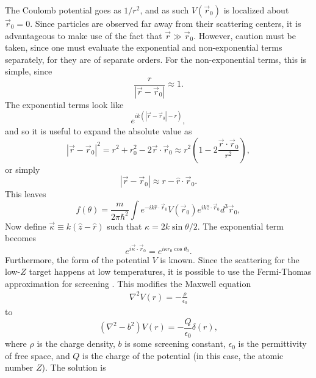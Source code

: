 The Coulomb potential goes as $1/r^2$, and as such $V(\vec{r}_0)$ is localized about $\vec{r}_0=0$. Since particles are observed far away from their scattering centers, it is advantageous to make use of the fact that $\vec{r} \gg \vec{r}_0$. However, caution must be taken, since one must evaluate the exponential and non-exponential terms separately, for they are of separate orders. For the non-exponential terms, this is simple, since
%
\begin{equation}\nonumber
\frac{r}{|\vec{r}-\vec{r}_0|}\approx1.
\end{equation}
%
The exponential terms look like
%
\begin{equation}\nonumber
e^{ik(|\vec{r}-\vec{r}_0|-r)},
\end{equation}
and so it is useful to expand the absolute value as
\begin{equation}\nonumber
|\vec{r}-\vec{r}_0|^2=r^2+r_0^2-2\vec{r}\cdot\vec{r}_0\approx r^2\left(1-2\frac{\vec{r}\cdot\vec{r}_0}{r^2}\right),
\end{equation}
%
or simply
%
\begin{equation} \nonumber |\vec{r}-\vec{r}_0|\approx r-\hat{r}\cdot\vec{r}_0. \end{equation}
%
This leaves
%
\begin{equation} \label{eqn:generalscattering}
f(\theta)=\frac{m}{2\pi\hbar^2}\int
e^{-ik\hat{r}\cdot\vec{r}_0}
V(\vec{r}_0)
e^{ik\hat{z}\cdot\vec{r}_0}
d^3\vec{r}_0,
\end{equation}
%
Now define $\vec{\kappa}\equiv k(\hat{z}-\hat{r})$ such that $\kappa=2k\sin{\theta/2}$. The exponential term becomes
%
\begin{equation} \nonumber
e^{i\vec{\kappa}\cdot\vec{r}_0}=e^{i\kappa r_0\cos{\theta_0}}.
\end{equation}
Furthermore, the form of the potential $V$ is known. Since the scattering for the low-$Z$ target happens at low temperatures, it is possible to use the Fermi-Thomas approximation for screening \cite{ashcroft}. This modifies the Maxwell equation 
\begin{align*}
\nabla^2 V(r) = -\frac{\rho}{\epsilon_0}
\end{align*}
to
\begin{equation} \nonumber
(\nabla^2-b^2)V(r)=-\frac{Q}{\epsilon_0}\delta(r),
\end{equation}
%
where $\rho$ is the charge density, $b$ is some screening constant, $\epsilon_0$ is the permittivity of free space, and $Q$ is the charge of the potential (in this case, the atomic number $Z$). The solution is
